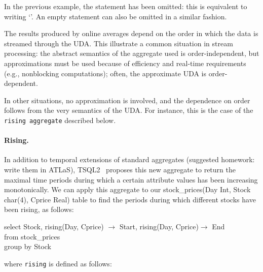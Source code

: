 In the previous example,
the  statement has been
omitted: this is equivalent to writing
 `{}'. An empty {}
statement can also be omitted in a similar fashion.

The results produced by online averages depend
on the order in which the data is streamed through the UDA.
This illustrate a common situation in stream processing:
the  abstract semantics of the aggregate used is
order-independent, but approximations must be used
because of efficiency and real-time requirements (e.g., nonblocking
computations); often, the approximate UDA is order-dependent.

In other situations, no approximation is involved, and the
dependence on order follows from the very semantics of the UDA.
For instance, this is the case of the {\tt rising aggregate} described below.
\paragraph{Rising.} In addition to temporal extensions of standard
aggregates (suggested homework: write them in ATLaS),
TSQL2~\cite{ads}
proposes this new aggregate to return the maximal time periods during
which a certain attribute values has been increasing monotonically.
We can apply this aggregate to our
{\cdf stock\_prices(Day Int, Stock char(4), Cprice Real)} table to find
the periods during which different stocks have been rising, as follows:

\begin{codedisplay}
\>\>select Stock, rising(Day, Cprice) $\rightarrow$ Start,
rising(Day, Cprice)$\rightarrow$ End\\
\>\>from stock\_prices\\
\>\>group by Stock \\
\end{codedisplay}
where {\tt rising} is defined as follows:


